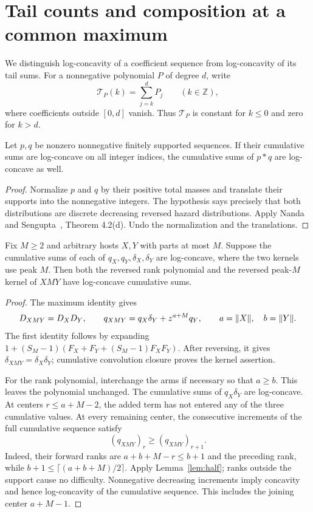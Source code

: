 \section{Tail counts and composition at a common maximum}\label{sec:cumulativecores}

We distinguish log-concavity of a coefficient sequence from log-concavity
of its tail sums. For a nonnegative polynomial $P$ of degree $d$, write
\[
 \mathcal T_P(k)=\sum_{j=k}^{d}P_j\qquad(k\in\mathbb Z),
\]
where coefficients outside $[0,d]$ vanish. Thus $\mathcal T_P$ is constant
for $k\le0$ and zero for $k>d$.

\begin{lemma}
Let $p,q$ be nonzero nonnegative finitely supported sequences. If their
cumulative sums are log-concave on all integer indices, the cumulative
sums of $p*q$ are log-concave as well.
\end{lemma}
\begin{proof}
Normalize $p$ and $q$ by their positive total masses and translate their
supports into the nonnegative integers. The hypothesis says precisely
that both distributions are discrete decreasing reversed hazard
distributions. Apply Nanda and Sengupta~\cite{NandaSengupta},
Theorem 4.2(d). Undo the normalization and the translations.
\end{proof}

\begin{lemma}\label{lem:cumulativegraft}
Fix $M\ge2$ and arbitrary hosts $X,Y$ with parts at most $M$.
Suppose the cumulative sums of each of $q_X,q_Y,\delta_X,\delta_Y$
are log-concave, where the two kernels use peak $M$.
Then both the reversed rank polynomial and the reversed peak-$M$
kernel of $XMY$ have log-concave cumulative sums.
\end{lemma}
\begin{proof}
The maximum identity gives
\[
 D_{XMY}=D_XD_Y,\qquad
 q_{XMY}=q_X\delta_Y+z^{a+M}q_Y,
 \qquad a=\lVert X\rVert,\quad b=\lVert Y\rVert.
\]
The first identity follows by expanding
$1+(S_M-1)(F_X+F_Y+(S_M-1)F_XF_Y)$.
After reversing, it gives $\delta_{XMY}=\delta_X\delta_Y$;
cumulative convolution closure proves the kernel assertion.

For the rank polynomial, interchange the arms if necessary so that
$a\ge b$. This leaves the polynomial unchanged. The cumulative sums of
$q_X\delta_Y$ are log-concave. At centers $r\le a+M-2$, the
added term has not entered any of the three cumulative values.
At every remaining center, the consecutive increments of the full
cumulative sequence satisfy
\[
 (q_{XMY})_r\ge(q_{XMY})_{r+1}.
\]
Indeed, their forward ranks are $a+b+M-r\le b+1$ and the preceding
rank, while $b+1\le\lceil(a+b+M)/2\rceil$. Apply
Lemma~\ref{lem:half}; ranks outside the support cause no difficulty.
Nonnegative decreasing increments imply concavity and hence
log-concavity of the cumulative sequence. This includes the joining
center $a+M-1$.
\end{proof}

